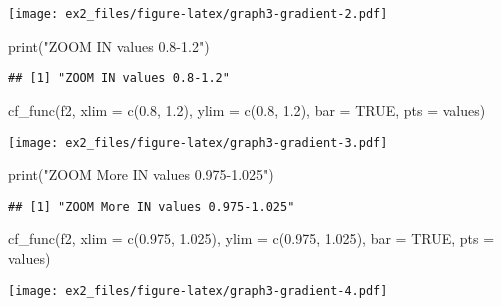 \documentclass[
]{article}
\newenvironment{Shaded}{\begin{snugshade}}{\end{snugshade}}
\newcommand{\AttributeTok}[1]{\textcolor[rgb]{0.77,0.63,0.00}{#1}}
\newcommand{\ConstantTok}[1]{\textcolor[rgb]{0.00,0.00,0.00}{#1}}
\newcommand{\FloatTok}[1]{\textcolor[rgb]{0.00,0.00,0.81}{#1}}
\newcommand{\FunctionTok}[1]{\textcolor[rgb]{0.00,0.00,0.00}{#1}}
\newcommand{\NormalTok}[1]{#1}
\newcommand{\StringTok}[1]{\textcolor[rgb]{0.31,0.60,0.02}{#1}}
\begin{document}
\texttt{[image: ex2\_files/figure-latex/graph3-gradient-2.pdf]}

\begin{Shaded}
\begin{Highlighting}[]
\FunctionTok{print}\NormalTok{(}\StringTok{"ZOOM IN values 0.8{-}1.2"}\NormalTok{)}
\end{Highlighting}
\end{Shaded}

\begin{verbatim}
## [1] "ZOOM IN values 0.8-1.2"
\end{verbatim}

\begin{Shaded}
\begin{Highlighting}[]
\FunctionTok{cf\_func}\NormalTok{(f2, }\AttributeTok{xlim =} \FunctionTok{c}\NormalTok{(}\FloatTok{0.8}\NormalTok{, }\FloatTok{1.2}\NormalTok{), }\AttributeTok{ylim =} \FunctionTok{c}\NormalTok{(}\FloatTok{0.8}\NormalTok{, }\FloatTok{1.2}\NormalTok{), }\AttributeTok{bar =} \ConstantTok{TRUE}\NormalTok{, }\AttributeTok{pts =}\NormalTok{ values)}
\end{Highlighting}
\end{Shaded}

\texttt{[image: ex2\_files/figure-latex/graph3-gradient-3.pdf]}

\begin{Shaded}
\begin{Highlighting}[]
\FunctionTok{print}\NormalTok{(}\StringTok{"ZOOM More IN values 0.975{-}1.025"}\NormalTok{)}
\end{Highlighting}
\end{Shaded}

\begin{verbatim}
## [1] "ZOOM More IN values 0.975-1.025"
\end{verbatim}

\begin{Shaded}
\begin{Highlighting}[]
\FunctionTok{cf\_func}\NormalTok{(f2, }\AttributeTok{xlim =} \FunctionTok{c}\NormalTok{(}\FloatTok{0.975}\NormalTok{, }\FloatTok{1.025}\NormalTok{), }\AttributeTok{ylim =} \FunctionTok{c}\NormalTok{(}\FloatTok{0.975}\NormalTok{, }\FloatTok{1.025}\NormalTok{), }\AttributeTok{bar =} \ConstantTok{TRUE}\NormalTok{, }\AttributeTok{pts =}\NormalTok{ values)}
\end{Highlighting}
\end{Shaded}

\texttt{[image: ex2\_files/figure-latex/graph3-gradient-4.pdf]}
\end{document}
